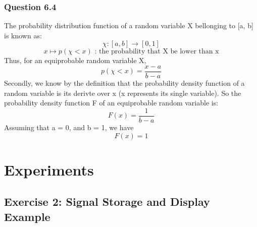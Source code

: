 \documentclass[a4paper,10pt]{article}
\begin{document}
    \subsubsection{Question 6.4 }
    The probability distribution function of a random variable X bellonging to [a, b] is known as:\newline
    \begin{equation}\chi:  [a, b]  \to [0, 1] \end{equation}
    \begin{equation}  x       \mapsto p(\chi < x)\mbox{ : the probability that X be lower than x} \end{equation}
    Thus, for an equiprobable random variable X, \begin{equation}p(\chi<x) = \frac{x - a}{b - a}  \end{equation}
    Secondly, we know by the definition that the probability density function of a random variable is its derivte over x (x represents its single variable).\newline
    So the probability density function F of an equiprobable random variable is:
    \begin{equation} F(x) = \frac{1}{b-a}\end{equation}
    Assuming that a = 0, and b = 1, we have
    \begin{equation} F(x) = 1\end{equation}


\section{Experiments}
    \subsection{Exercise 2: Signal Storage and Display Example}
\end{document}
